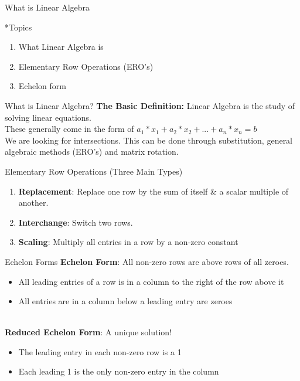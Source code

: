 \documentclass[a4paper, 12pt]{article}
\begin{document}
\begin{section}{What is Linear Algebra}
	\begin{subsection}*{Topics}
\begin{enumerate}
		\item{What Linear Algebra is}
		\item{Elementary Row Operations (ERO's)}
		\item{Echelon form}
\end{enumerate}
	\end{subsection}
	\begin{subsection}{What is Linear Algebra?}
	\textbf{The Basic Definition:} Linear Algebra
	is the study of solving linear equations.\\
	These generally come in the form of
	$a_1*x_1+a_2*x_2+...+a_n*x_n=b$\\
	We are looking for intersections. This can be 
	done through substitution, general algebraic methods
	(ERO's) and matrix rotation. \\
\end{subsection}
\begin{subsection}{Elementary Row Operations (Three Main Types)}
\begin{enumerate}
	\item{\textbf{Replacement}: Replace one row by the 
		sum of itself & a scalar multiple of another.}
	\item{\textbf{Interchange}: Switch two rows.}
	\item{\textbf{Scaling}: Multiply all entries in a row by
		a non-zero constant}
\end{enumerate}
\end{subsection}
\begin{subsection}{Echelon Forms}
	\textbf{Echelon Form}: All non-zero rows are above rows
	of all zeroes.
	\begin{itemize}
	\item{All leading entries of a row is in a column to 
		the right of the row above it}
	\item{All entries are in a column below a leading entry
		are zeroes}
	\end{itemize}
	\\ \textbf{Reduced Echelon Form}: A unique solution!
	\begin{itemize}
\item{The leading entry in each non-zero row is a 1}
\item{Each leading 1 is the only non-zero entry in the column}
	\end{itemize}
\end{subsection}


\end{section}
\end{document}
